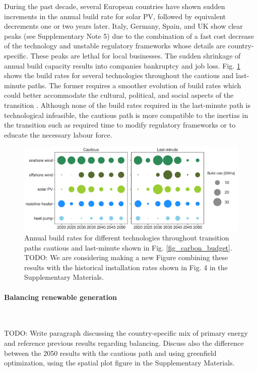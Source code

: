 \documentclass[5p]{elsarticle} %
\begin{document}
During the past decade, several European countries have shown sudden increments in the annual build rate for solar PV, followed by equivalent decrements one or two years later. Italy, Germany, Spain, and UK show clear peaks (see Supplementary Note 5)  due to the combination of a fast cost decrease of the technology and unstable regulatory frameworks whose details are country-specific. These peaks are lethal for local businesses. The sudden shrinkage of annual build capacity results into companies bankruptcy and job loss. Fig. \ref{fig_build_rates}  shows the build rates for several technologies throughout the cautious and last-minute paths. The former requires a smoother evolution of build rates which could better accommodate the cultural, political, and social aspects of the transition \cite{Geels_2017}. Although none of the build rates required in the last-minute path is technological infeasible, the cautious path is more compatible to the inertias in the transition such as required time to modify regulatory frameworks or to educate the necessary labour force. 

\begin{figure}[!h]
\centering
\includegraphics[width=\columnwidth]{figures/build_rates.png}
\caption{Annual build rates for different technologies throughout transition paths cautious and last-minute shown in Fig. \ref{fig_carbon_budget}. \textcolor[rgb]{1,0,0}{TODO: We are considering making a new Figure combining these results with the historical installation rates shown in Fig. 4 in the Supplementary Materials.} } \label{fig_build_rates} 
\end{figure}


\paragraph{\textbf{Balancing renewable generation}} \

\textcolor[rgb]{1,0,0}{TODO: Write paragraph discussing the country-specific mix of primary energy and reference previous results regarding balancing. Discuss also the difference between the 2050 results with the cautious path and using greenfield optimization, using the spatial plot figure in the Supplementary Materials.}
\end{document}
